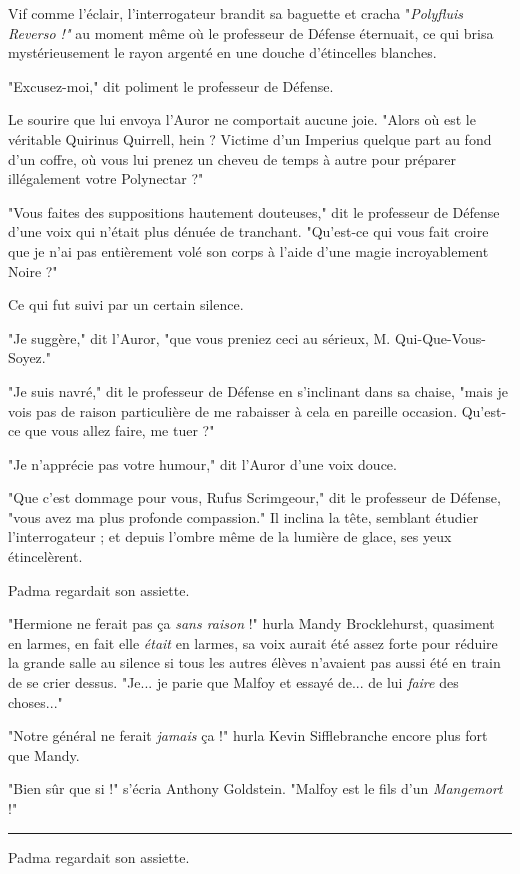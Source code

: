 Vif comme l'éclair, l'interrogateur brandit sa baguette et cracha "\emph{Polyfluis Reverso !"}  au moment même où le professeur de Défense éternuait, ce qui brisa mystérieusement le rayon argenté en une douche d'étincelles blanches.

"Excusez-moi," dit poliment le professeur de Défense.

Le sourire que lui envoya l'Auror ne comportait aucune joie. "Alors où est le véritable Quirinus Quirrell, hein ? Victime d'un Imperius quelque part au fond d'un coffre, où vous lui prenez un cheveu de temps à autre pour préparer illégalement votre Polynectar ?"

"Vous faites des suppositions hautement douteuses," dit le professeur de Défense d'une voix qui n'était plus dénuée de tranchant. "Qu'est-ce qui vous fait croire que je n'ai pas entièrement volé son corps à l'aide d'une magie incroyablement Noire ?"

Ce qui fut suivi par un certain silence.

"Je suggère," dit l'Auror, "que vous preniez ceci au sérieux, M. Qui-Que-Vous-Soyez."

"Je suis navré," dit le professeur de Défense en s'inclinant dans sa chaise, "mais je vois pas de raison particulière de me rabaisser à cela en pareille occasion. Qu'est-ce que vous allez faire, me tuer ?"

"Je n'apprécie pas votre humour," dit l'Auror d'une voix douce.

"Que c'est dommage pour vous, Rufus Scrimgeour," dit le professeur de Défense, "vous avez ma plus profonde compassion." Il inclina la tête, semblant étudier l'interrogateur ; et depuis l'ombre même de la lumière de glace, ses yeux étincelèrent.

Padma regardait son assiette.

"Hermione ne ferait pas ça \emph{sans raison } !" hurla Mandy Brocklehurst, quasiment en larmes, en fait elle \emph{était}  en larmes, sa voix aurait été assez forte pour réduire la grande salle au silence si tous les autres élèves n'avaient pas aussi été en train de se crier dessus. "Je... je parie que Malfoy et essayé de... de lui \emph{faire}  des choses..."

"Notre général ne ferait \emph{jamais}  ça !" hurla Kevin Sifflebranche encore plus fort que Mandy.

"Bien sûr que si !" s'écria Anthony Goldstein. "Malfoy est le fils d'un \emph{Mangemort } !"
\par\noindent\rule{\textwidth}{0.4pt}
Padma regardait son assiette.

